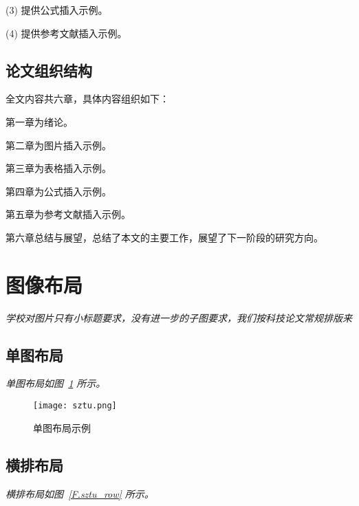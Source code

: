 (3) 提供公式插入示例。

(4) 提供参考文献插入示例。

\subsection{论文组织结构}

全文内容共六章，具体内容组织如下：

第一章为绪论。

第二章为图片插入示例。

第三章为表格插入示例。

第四章为公式插入示例。

第五章为参考文献插入示例。

第六章总结与展望，总结了本文的主要工作，展望了下一阶段的研究方向。


\section{图像布局}
\label{sec.figure}

\emph{学校对图片只有小标题要求，没有进一步的子图要求，我们按科技论文常规排版来}

\subsection{单图布局}

\lipsum

\emph{单图布局如图~\ref{F.sztu_single} 所示。}

\begin{figure}[hbt]
\centering
\texttt{[image: sztu.png]}
\caption{单图布局示例}
\label{F.sztu_single}
\end{figure}

\subsection{横排布局}

\emph{横排布局如图~\ref{F.sztu_row} 所示。}

